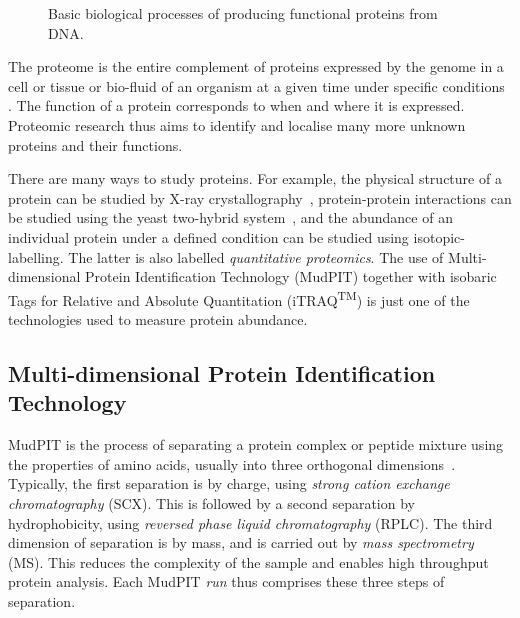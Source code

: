 \documentclass[11pt,a4paper]{article}
\begin{document}
\begin{figure}[hbt]
\caption{Basic biological processes of producing functional proteins from DNA.}
\label{fig:processes}
\end{figure}

The proteome is the entire complement of proteins expressed by the genome in a cell or tissue or bio-fluid of an organism at a given time under specific conditions \citep{Boehm2007}. The function of a protein corresponds to when and where it is expressed. Proteomic research thus aims to identify and localise many more unknown proteins and their functions. 

There are many ways to study proteins. For example, the physical structure of a protein can be studied by X-ray crystallography~\citep{Blow2002}, protein-protein interactions can be studied using the yeast two-hybrid system~\citep{Fields1989}, and the abundance of an individual protein under a defined condition can be studied using isotopic-labelling. The latter is also labelled \emph{quantitative proteomics}. The use of Multi-dimensional Protein Identification Technology (MudPIT) together with isobaric Tags for Relative and Absolute Quantitation (iTRAQ\textsuperscript{TM}) is just one of the technologies used to measure protein abundance.  

\subsection{Multi-dimensional Protein Identification Technology} \label{subsec:MudPIT}
MudPIT is the process of separating a protein complex or peptide mixture using the properties of amino acids, usually into three orthogonal dimensions~\citep{Washburn2001}. Typically, the first separation is by charge, using \emph{strong cation exchange chromatography} (SCX). This is followed by a second separation by hydrophobicity, using \emph{reversed phase liquid chromatography} (RPLC). The third dimension of separation is by mass, and is carried out by \emph{mass spectrometry} (MS). This reduces the complexity of the sample and enables high throughput protein analysis. Each MudPIT \emph{run} thus comprises these three steps of separation.
\end{document}
